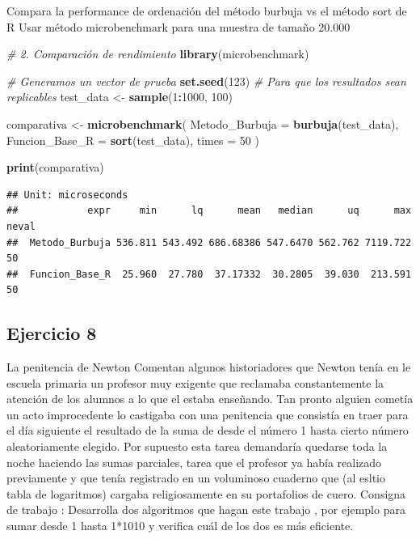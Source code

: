 \documentclass[runningheads]{llncs}
\newenvironment{Shaded}{\begin{snugshade}}{\end{snugshade}}
\newcommand{\AttributeTok}[1]{\textcolor[rgb]{0.13,0.29,0.53}{#1}}
\newcommand{\CommentTok}[1]{\textcolor[rgb]{0.56,0.35,0.01}{\textit{#1}}}
\newcommand{\DecValTok}[1]{\textcolor[rgb]{0.00,0.00,0.81}{#1}}
\newcommand{\FunctionTok}[1]{\textcolor[rgb]{0.13,0.29,0.53}{\textbf{#1}}}
\newcommand{\NormalTok}[1]{#1}
\newcommand{\OtherTok}[1]{\textcolor[rgb]{0.56,0.35,0.01}{#1}}
\newcommand{\SpecialCharTok}[1]{\textcolor[rgb]{0.81,0.36,0.00}{\textbf{#1}}}
\begin{document}
Compara la performance de ordenación del método burbuja vs el método
sort de R Usar método microbenchmark para una muestra de tamaño 20.000

\begin{Shaded}
\begin{Highlighting}[]
\CommentTok{\# 2. Comparación de rendimiento}
\FunctionTok{library}\NormalTok{(microbenchmark)}

\CommentTok{\# Generamos un vector de prueba}
\FunctionTok{set.seed}\NormalTok{(}\DecValTok{123}\NormalTok{) }\CommentTok{\# Para que los resultados sean replicables}
\NormalTok{test\_data }\OtherTok{\textless{}{-}} \FunctionTok{sample}\NormalTok{(}\DecValTok{1}\SpecialCharTok{:}\DecValTok{1000}\NormalTok{, }\DecValTok{100}\NormalTok{)}

\NormalTok{comparativa }\OtherTok{\textless{}{-}} \FunctionTok{microbenchmark}\NormalTok{(}
  \AttributeTok{Metodo\_Burbuja =} \FunctionTok{burbuja}\NormalTok{(test\_data),}
  \AttributeTok{Funcion\_Base\_R =} \FunctionTok{sort}\NormalTok{(test\_data),}
  \AttributeTok{times =} \DecValTok{50}
\NormalTok{)}

\FunctionTok{print}\NormalTok{(comparativa)}
\end{Highlighting}
\end{Shaded}

\begin{verbatim}
## Unit: microseconds
##            expr     min      lq      mean   median      uq      max neval
##  Metodo_Burbuja 536.811 543.492 686.68386 547.6470 562.762 7119.722    50
##  Funcion_Base_R  25.960  27.780  37.17332  30.2805  39.030  213.591    50
\end{verbatim}

\subsection{Ejercicio 8}\label{ejercicio-8}

La penitencia de Newton Comentan algunos historiadores que Newton tenía
en le escuela primaria un profesor muy exigente que reclamaba
constantemente la atención de los alumnos a lo que el estaba enseñando.
Tan pronto alguien cometía un acto improcedente lo castigaba con una
penitencia que consistía en traer para el día siguiente el resultado de
la suma de desde el número 1 hasta cierto número aleatoriamente elegido.
Por supuesto esta tarea demandaría quedarse toda la noche haciendo las
sumas parciales, tarea que el profesor ya había realizado previamente y
que tenía registrado en un voluminoso cuaderno que (al esltio tabla de
logaritmos) cargaba religiosamente en su portafolios de cuero. Consigna
de trabajo : Desarrolla dos algoritmos que hagan este trabajo , por
ejemplo para sumar desde 1 hasta 1*1010 y verifica cuál de los dos es
más eficiente.
\end{document}
